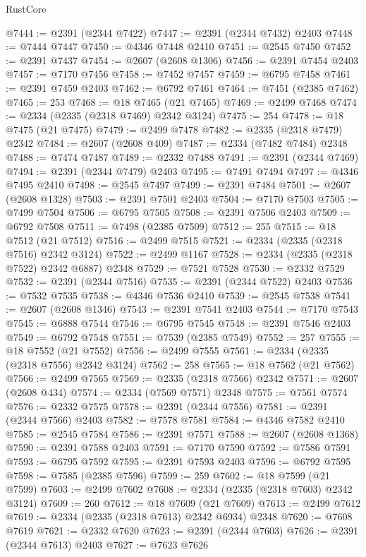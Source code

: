 \begin{lexlean}{RustCore}
\begin{coremodule}
@7444 := @2391 (@2344 @7422)
@7447 := @2391 (@2344 @7432) @2403
@7448 := @7444 @7447
@7450 := @4346 @7448 @2410
@7451 := @2545 @7450
@7452 := @2391 @7437
@7454 := @2607 (@2608 @1306)
@7456 := @2391 @7454 @2403
@7457 := @7170 @7456
@7458 := @7452 @7457
@7459 := @6795 @7458
@7461 := @2391 @7459 @2403
@7462 := @6792 @7461
@7464 := @7451 (@2385 @7462)
@7465 := 253
@7468 := @18 @7465 (@21 @7465)
@7469 := @2499 @7468
@7474 := @2334 (@2335 (@2318 @7469) @2342 @3124)
@7475 := 254
@7478 := @18 @7475 (@21 @7475)
@7479 := @2499 @7478
@7482 := @2335 (@2318 @7479) @2342
@7484 := @2607 (@2608 @409)
@7487 := @2334 (@7482 @7484) @2348
@7488 := @7474 @7487
@7489 := @2332 @7488
@7491 := @2391 (@2344 @7469)
@7494 := @2391 (@2344 @7479) @2403
@7495 := @7491 @7494
@7497 := @4346 @7495 @2410
@7498 := @2545 @7497
@7499 := @2391 @7484
@7501 := @2607 (@2608 @1328)
@7503 := @2391 @7501 @2403
@7504 := @7170 @7503
@7505 := @7499 @7504
@7506 := @6795 @7505
@7508 := @2391 @7506 @2403
@7509 := @6792 @7508
@7511 := @7498 (@2385 @7509)
@7512 := 255
@7515 := @18 @7512 (@21 @7512)
@7516 := @2499 @7515
@7521 := @2334 (@2335 (@2318 @7516) @2342 @3124)
@7522 := @2499 @1167
@7528 := @2334 (@2335 (@2318 @7522) @2342 @6887) @2348
@7529 := @7521 @7528
@7530 := @2332 @7529
@7532 := @2391 (@2344 @7516)
@7535 := @2391 (@2344 @7522) @2403
@7536 := @7532 @7535
@7538 := @4346 @7536 @2410
@7539 := @2545 @7538
@7541 := @2607 (@2608 @1346)
@7543 := @2391 @7541 @2403
@7544 := @7170 @7543
@7545 := @6888 @7544
@7546 := @6795 @7545
@7548 := @2391 @7546 @2403
@7549 := @6792 @7548
@7551 := @7539 (@2385 @7549)
@7552 := 257
@7555 := @18 @7552 (@21 @7552)
@7556 := @2499 @7555
@7561 := @2334 (@2335 (@2318 @7556) @2342 @3124)
@7562 := 258
@7565 := @18 @7562 (@21 @7562)
@7566 := @2499 @7565
@7569 := @2335 (@2318 @7566) @2342
@7571 := @2607 (@2608 @434)
@7574 := @2334 (@7569 @7571) @2348
@7575 := @7561 @7574
@7576 := @2332 @7575
@7578 := @2391 (@2344 @7556)
@7581 := @2391 (@2344 @7566) @2403
@7582 := @7578 @7581
@7584 := @4346 @7582 @2410
@7585 := @2545 @7584
@7586 := @2391 @7571
@7588 := @2607 (@2608 @1368)
@7590 := @2391 @7588 @2403
@7591 := @7170 @7590
@7592 := @7586 @7591
@7593 := @6795 @7592
@7595 := @2391 @7593 @2403
@7596 := @6792 @7595
@7598 := @7585 (@2385 @7596)
@7599 := 259
@7602 := @18 @7599 (@21 @7599)
@7603 := @2499 @7602
@7608 := @2334 (@2335 (@2318 @7603) @2342 @3124)
@7609 := 260
@7612 := @18 @7609 (@21 @7609)
@7613 := @2499 @7612
@7619 := @2334 (@2335 (@2318 @7613) @2342 @6934) @2348
@7620 := @7608 @7619
@7621 := @2332 @7620
@7623 := @2391 (@2344 @7603)
@7626 := @2391 (@2344 @7613) @2403
@7627 := @7623 @7626

\end{coremodule}
\end{lexlean}
